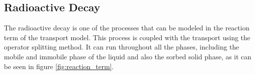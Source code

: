% 


\subsection{Radioactive Decay}
\label{sec:decay}
The radioactive decay is one of the processes that can be modeled in the reaction term of the transport model.
This process is coupled with the transport using the operator splitting method.
It can run throughout all the phases, including the mobile and immobile phase of the liquid 
and also the sorbed solid phase, as it can be seen in figure \ref{fig:reaction_term}.

